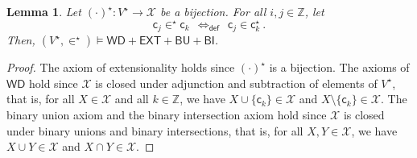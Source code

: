 \documentclass[10pt,a4paper, openany,  oldfontcommands]{memoir}
\newtheorem{lemma} [theorem] {Lemma}
\newtheorem{open problem} [theorem] {Open Problem}
\begin{document}
\begin{lemma}   \label{FirstBasicLemma}
Let   $  (  \cdot )^{  \star }   :  V^{  \star }     \to        \mathcal{X}   $    be a  bijection.  
For all  $i, j \in   \mathbb{Z} $, let    
\[
   \mathsf{c}_j   \in^{   \star }   \mathsf{c}_k       \        \     \Leftrightarrow_{  \mathsf{def}  }      \       \       \mathsf{c}_j   \in    \mathsf{c}_k^{  \star }   
   \      .
   \]
Then, $ \left(  V^{  \star }    ,  \in^{ \star }  \right)    \models      \mathsf{WD} +  \mathsf{EXT} +       \mathsf{BU}    +  \mathsf{BI} $. 
\end{lemma}
\begin{proof}
The axiom of extensionality holds since  $    (  \cdot )^{  \star }  $  is a bijection. 
The axioms of  $  \mathsf{WD}  $ hold since $  \mathcal{X} $ is closed under adjunction and subtraction of elements of  $  V^{  \star }  $,  that is, 
for all   $  X \in  \mathcal{X}  $  and  all  $ k \in   \mathbb{Z} $,  we have 
$  X  \cup  \lbrace \mathsf{c}_k \rbrace \in  \mathcal{X}    $  and  $  X  \setminus   \lbrace \mathsf{c}_k \rbrace \in  \mathcal{X}    $.
The binary union axiom and the binary intersection axiom hold  since   $   \mathcal{X}   $  is closed under  binary unions and binary intersections, that is, 
for all $ X, Y \in    \mathcal{X}     $,   we have $  X \cup Y \in   \mathcal{X}     $  and $  X  \cap  Y  \in    \mathcal{X}     $.
\end{proof}
\end{document}
